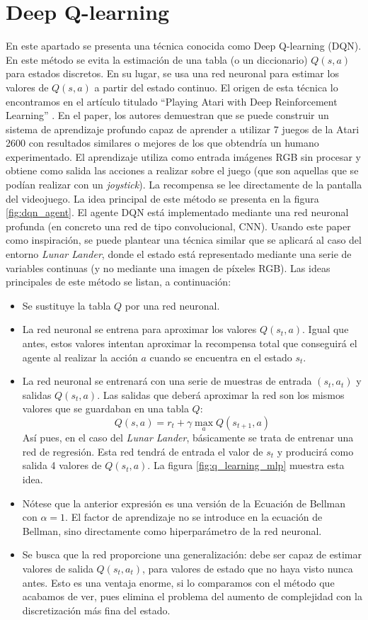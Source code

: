 \documentclass{article}
\begin{document}
\section{Deep Q-learning}
En este apartado se presenta una técnica conocida como Deep Q-learning (DQN). En este método se evita la estimación de una tabla (o un diccionario) $Q(s,a)$ para estados discretos. En su lugar, se usa una red neuronal para estimar los valores de $Q(s,a)$ a partir del estado continuo.
El origen de esta técnica lo encontramos en el artículo titulado ``Playing Atari with Deep Reinforcement Learning'' \cite{MnihKSGAWR13}. En el paper, los autores demuestran que se puede construir un sistema de aprendizaje profundo capaz de aprender a utilizar 7 juegos de la Atari 2600 con resultados similares o mejores de los que obtendría un humano experimentado. El aprendizaje utiliza como entrada imágenes RGB sin procesar y obtiene como salida las acciones a realizar sobre el juego (que son aquellas que se podían realizar con un \textit{joystick}). La recompensa se lee directamente de la pantalla del videojuego. La idea principal de este método se presenta en la figura \ref{fig:dqn_agent}. El agente DQN está implementado mediante una red neuronal profunda (en concreto una red de tipo convolucional, CNN). Usando este paper como inspiración, se puede plantear una técnica similar que se aplicará al caso del entorno \textit{Lunar Lander}, donde el estado está representado mediante una serie de variables continuas (y no mediante una imagen de píxeles RGB). Las ideas principales de este método se listan, a continuación:
\begin{itemize}
    \item Se sustituye la tabla $Q$ por una red neuronal.
    \item La red neuronal se entrena para aproximar los valores $Q(s_t, a)$. Igual que antes, estos valores intentan aproximar la recompensa total que conseguirá el agente al realizar la acción $a$ cuando se encuentra en el estado $s_t$.
    \item La red neuronal se entrenará con una serie de muestras de entrada $(s_t, a_t)$ y salidas $Q(s_t, a)$. Las salidas que deberá aproximar la red son los mismos valores que se guardaban en una tabla $Q$:
    $$Q(s, a) = r_t+\gamma\max_a{Q(s_{t+1}, a)}$$
    Así pues, en el caso del \textit{Lunar Lander}, básicamente se trata de entrenar una red de regresión. Esta red tendrá de entrada el valor de $s_t$ y producirá como salida 4 valores de $Q(s_t, a)$. La figura \ref{fig:q_learning_mlp} muestra esta idea.
    \item Nótese que la anterior expresión es una versión de la Ecuación de Bellman con $\alpha=1$. El factor de aprendizaje no se introduce en la ecuación de Bellman, sino directamente como hiperparámetro de la red neuronal.
    \item Se busca que la red proporcione una generalización: debe ser capaz de estimar valores de  salida $Q(s_t, a_t)$, para valores de estado que no haya visto nunca antes. Esto es una ventaja enorme, si lo comparamos con el método que acabamos de ver, pues elimina el problema del aumento de complejidad con la discretización más fina del estado.
\end{itemize}
\end{document}
